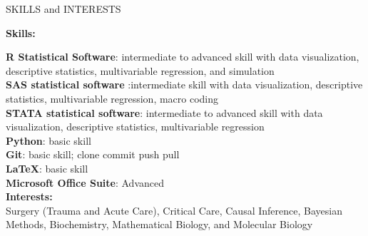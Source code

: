 \documentclass{resume} %
\begin{document}
\begin{rSection}{SKILLS and
INTERESTS}

\textbf{Skills:}
\vspace{0.25pt}

\space \textbf{R Statistical Software}: intermediate to advanced skill with data visualization,
descriptive statistics, multivariable regression, and simulation\\
\space\textbf{SAS statistical software} :intermediate skill with data visualization, descriptive statistics,
multivariable regression, macro coding\\
\space \textbf{STATA statistical software}: intermediate to advanced skill with data visualization, descriptive statistics, multivariable regression\\
\space \textbf{Python}: basic skill\\
\space \textbf{Git}: basic skill; clone commit push pull\\
\space \textbf{\LaTeX}: basic skill\\ 
\space \textbf{Microsoft Office Suite}: Advanced\\

\textbf{Interests:} \\
Surgery (Trauma and Acute Care), Critical Care, Causal Inference, Bayesian Methods, Biochemistry, Mathematical Biology, and Molecular Biology 

\end{rSection}





% 
%
\end{document}
